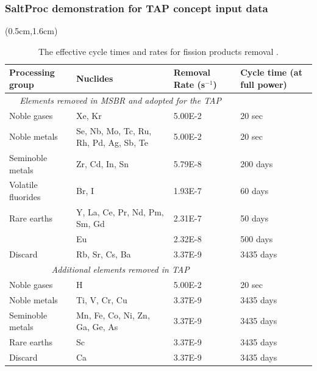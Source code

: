 \begin{frame}
\frametitle{SaltProc demonstration for TAP concept input data}
\begin{textblock*}{12.5cm}(0.5cm,1.6cm) %
	\begin{table}[htbp!]
		\fontsize{6}{9}\selectfont
		\centering
		\caption{The effective cycle times and rates for fission products 
		removal \cite{robertson_conceptual_1971, betzler_implementation_2017}.}
			\vspace{-2mm}
		\begin{tabular}{p{} p{} p{} 
				p{}}
			\hline 
			\textbf{Processing group} & \qquad\qquad\qquad \textbf{Nuclides} & 
			\textbf{Removal Rate (s$^{-1}$)} & \textbf{Cycle time (at full 
			power)} 
			\\ \hline 
			\multicolumn{3}{c}{\textit{Elements removed in \gls{MSBR} and 
			adopted for the \gls{TAP}} 
					\cite{robertson_conceptual_1971}} \\
			Noble gases & Xe, Kr								  & 5.00E-2 & 
			20 
			sec \\
			Noble metals & Se, Nb, Mo, Tc, Ru, Rh, Pd, Ag, Sb, Te & 5.00E-2 & 
			20 
			sec \\
			Seminoble metals & Zr, Cd, In, Sn	  				  & 5.79E-8 & 
			200 
			days\\
			Volatile fluorides & Br, I 							  & 1.93E-7 & 
			60 
			days\\
			Rare earths & Y, La, Ce, Pr, Nd, Pm, Sm, Gd           & 2.31E-7 & 
			50 
			days\\
			\qquad & Eu & 2.32E-8 & 500 days \\
			Discard & Rb, Sr, Cs, Ba & 3.37E-9 & 3435 days \\
			\hline
			\multicolumn{3}{c}{\textit{Additional elements removed in 
			\gls{TAP}} 
				\cite{betzler_implementation_2017, 
					transatomic_power_corporation_neutronics_2016}} \\
			Noble gases & H								  	& 5.00E-2 & 20 
			sec    \\
			Noble metals & Ti, V, Cr, Cu						& 3.37E-9 & 
			3435 
			days \\
			Seminoble metals & Mn, Fe, Co, Ni, Zn, Ga, Ge, As   & 3.37E-9 & 
			3435 
			days \\
			Rare earths & Sc									& 3.37E-9 & 
			3435 
			days \\
			Discard & Ca										& 3.37E-9 & 
			3435 
			days \\

\end{tabular}
\end{table}
\end{textblock*}
\end{frame}
